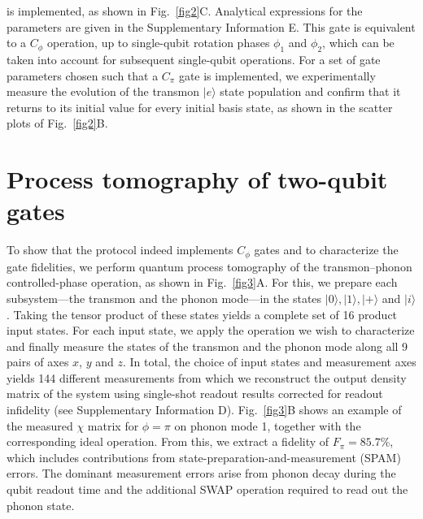 \documentclass[12pt]{article}
\newcommand{\ket}[1]{\ensuremath{|{#1}\rangle}}
\begin{document}
\noindent is implemented, as shown in Fig.~\ref{fig2}C. Analytical expressions for the parameters are given in the Supplementary Information E. This gate is equivalent to a $C_{\phi}$ operation, up to single-qubit rotation phases $\phi_1$ and $\phi_2$, which can be taken into account for subsequent single-qubit operations. For a set of gate parameters chosen such that a $C_{\pi}$ gate is implemented, we experimentally measure the evolution of the transmon $\ket{e}$ state population and confirm that it returns to its initial value for every initial basis state, as shown in the scatter plots of Fig.~\ref{fig2}B.

\section*{Process tomography of two-qubit gates}
To show that the protocol indeed implements $C_{\phi}$ gates and to characterize the gate fidelities, we perform quantum process tomography of the transmon–phonon controlled-phase operation, as shown in Fig.~\ref{fig3}A. For this, we prepare each subsystem—the transmon and the phonon mode—in the states $\ket{0}, \ket{1}, \ket{+}$ and $\ket{i}$. Taking the tensor product of these states yields a complete set of 16 product input states. For each input state, we apply the operation we wish to characterize and finally measure the states of the transmon and the phonon mode along all 9 pairs of axes $x$, $y$ and $z$. In total, the choice of input states and measurement axes yields 144 different measurements from which we reconstruct the output density matrix of the system using single-shot readout results corrected for readout infidelity (see Supplementary Information D). Fig.~\ref{fig3}B shows an example of the measured $\chi$ matrix for $\phi = \pi$ on phonon mode 1, together with the corresponding ideal operation. From this, we extract a fidelity of $F_{\pi} = 85.7\%$, which includes contributions from state-preparation-and-measurement (SPAM) errors. The dominant measurement errors arise from phonon decay during the qubit readout time and the additional SWAP operation required to read out the phonon state.
\end{document}
